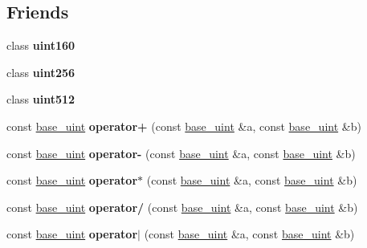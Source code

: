 \subsection*{Friends}
\begin{DoxyCompactItemize}
\item 
\mbox{\label{classbase__uint_aa02da58f540b087723acd9a92ceca5f1}} 
class {\bfseries uint160}
\item 
\mbox{\label{classbase__uint_a2748616a40a1e4fdd6db14b92e9619e2}} 
class {\bfseries uint256}
\item 
\mbox{\label{classbase__uint_a0d7ebbc9f372d8d9d46f50083d0aaad7}} 
class {\bfseries uint512}
\item 
\mbox{\label{classbase__uint_ab46abc7a4c02bbbe6ee4d44db58f36fd}} 
const \mbox{\hyperlink{classbase__uint}{base\+\_\+uint}} {\bfseries operator+} (const \mbox{\hyperlink{classbase__uint}{base\+\_\+uint}} \&a, const \mbox{\hyperlink{classbase__uint}{base\+\_\+uint}} \&b)
\item 
\mbox{\label{classbase__uint_a42603f675219a79c1087da39677dd6d3}} 
const \mbox{\hyperlink{classbase__uint}{base\+\_\+uint}} {\bfseries operator-\/} (const \mbox{\hyperlink{classbase__uint}{base\+\_\+uint}} \&a, const \mbox{\hyperlink{classbase__uint}{base\+\_\+uint}} \&b)
\item 
\mbox{\label{classbase__uint_a7cc93af608b4d2b8e45f8a18bb085cf0}} 
const \mbox{\hyperlink{classbase__uint}{base\+\_\+uint}} {\bfseries operator$\ast$} (const \mbox{\hyperlink{classbase__uint}{base\+\_\+uint}} \&a, const \mbox{\hyperlink{classbase__uint}{base\+\_\+uint}} \&b)
\item 
\mbox{\label{classbase__uint_a3027097ea3718db496e486d5c64a6bbd}} 
const \mbox{\hyperlink{classbase__uint}{base\+\_\+uint}} {\bfseries operator/} (const \mbox{\hyperlink{classbase__uint}{base\+\_\+uint}} \&a, const \mbox{\hyperlink{classbase__uint}{base\+\_\+uint}} \&b)
\item 
\mbox{\label{classbase__uint_af11d7776598f6633c139636314f065d6}} 
const \mbox{\hyperlink{classbase__uint}{base\+\_\+uint}} {\bfseries operator$\vert$} (const \mbox{\hyperlink{classbase__uint}{base\+\_\+uint}} \&a, const \mbox{\hyperlink{classbase__uint}{base\+\_\+uint}} \&b)

\end{DoxyCompactItemize}
